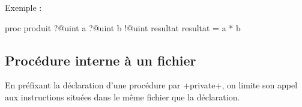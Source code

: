 Exemple :

\begin{galgascode}
proc produit ?@uint a ?@uint b !@uint resultat {
  resultat = a * b
}
\end{galgascode}



\subsection{Procédure interne à un fichier}

En préfixant la déclaration d'une procédure par \ggs+private+, on limite son appel aux instructions situées dans le même fichier que la déclaration.



